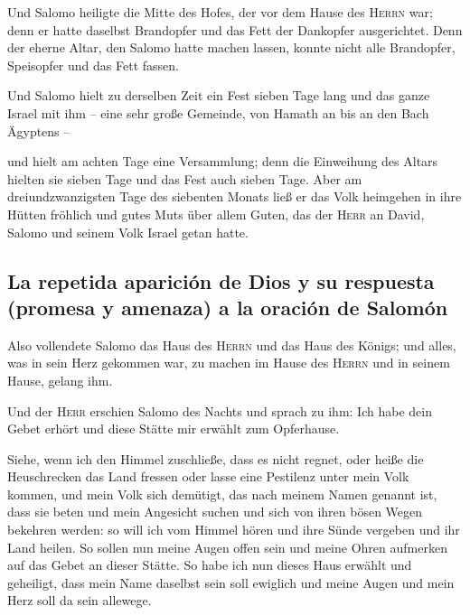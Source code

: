  Und Salomo heiligte die Mitte des Hofes, der vor dem
Hause des \textsc{Herrn} war; denn er hatte daselbst Brandopfer und das
Fett der Dankopfer ausgerichtet. Denn der eherne Altar, den Salomo hatte
machen lassen, konnte nicht alle Brandopfer, Speisopfer und das Fett
fassen.

 Und Salomo hielt zu derselben Zeit ein Fest sieben Tage
lang und das ganze Israel mit ihm -- eine sehr große Gemeinde, von
Hamath an bis an den Bach Ägyptens --

 und hielt am achten Tage eine Versammlung; denn die
Einweihung des Altars hielten sie sieben Tage und das Fest auch sieben
Tage.  Aber am dreiundzwanzigsten Tage des siebenten
Monats ließ er das Volk heimgehen in ihre Hütten fröhlich und gutes Muts
über allem Guten, das der \textsc{Herr} an David, Salomo und seinem Volk
Israel getan hatte.

\hypertarget{la-repetida-apariciuxf3n-de-dios-y-su-respuesta-promesa-y-amenaza-a-la-oraciuxf3n-de-salomuxf3n}{%
\subsection{La repetida aparición de Dios y su respuesta (promesa y
amenaza) a la oración de
Salomón}\label{la-repetida-apariciuxf3n-de-dios-y-su-respuesta-promesa-y-amenaza-a-la-oraciuxf3n-de-salomuxf3n}}

 Also vollendete Salomo das Haus des \textsc{Herrn} und
das Haus des Königs; und alles, was in sein Herz gekommen war, zu machen
im Hause des \textsc{Herrn} und in seinem Hause, gelang ihm.

 Und der \textsc{Herr} erschien Salomo des Nachts und
sprach zu ihm: Ich habe dein Gebet erhört und diese Stätte mir erwählt
zum Opferhause.

 Siehe, wenn ich den Himmel zuschließe, dass es nicht
regnet, oder heiße die Heuschrecken das Land fressen oder lasse eine
Pestilenz unter mein Volk kommen,  und mein Volk sich
demütigt, das nach meinem Namen genannt ist, dass sie beten und mein
Angesicht suchen und sich von ihren bösen Wegen bekehren werden: so will
ich vom Himmel hören und ihre Sünde vergeben und ihr Land heilen.
 So sollen nun meine Augen offen sein und meine Ohren
aufmerken auf das Gebet an dieser Stätte.  So habe ich
nun dieses Haus erwählt und geheiligt, dass mein Name daselbst sein soll
ewiglich und meine Augen und mein Herz soll da sein allewege.

